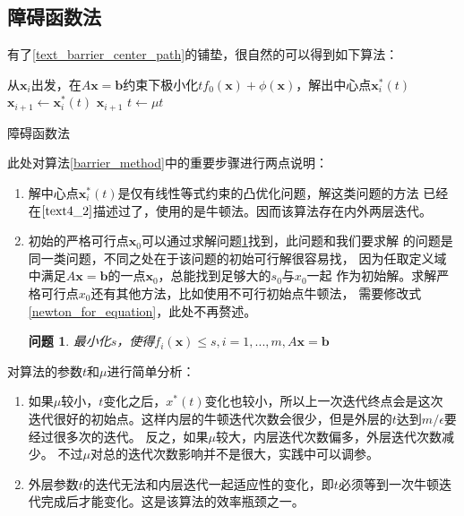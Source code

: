 \documentclass{article}
\newtheorem{problem}{问题}
\begin{document}
\subsection{障碍函数法}
\label{text_barrier_method}
有了\ref{text_barrier_center_path}的铺垫，很自然的可以得到如下算法：

\renewcommand{\algorithmcfname}{算法}
\begin{algorithm}[H]
     {
        从$\bm x_i$出发，在$A\bm x=\bm b$约束下极小化$tf_0(\bm x)+\phi(\bm x)$，解出中心点$\bm x_i^*(t)$\;
        $\bm x_{i+1}\leftarrow\bm x_i^*(t)$\;
         {
            \Return $\bm x_{i+1}$
        }
        $t\leftarrow \mu t$
    }
    \caption{障碍函数法}
    \label{barrier_method}
\end{algorithm}

此处对算法\ref{barrier_method}中的重要步骤进行两点说明：
\begin{enumerate}
    \item 解中心点$\bm x_i^*(t)$是仅有线性等式约束的凸优化问题，解这类问题的方法
    已经在$\ref{text4_2}$描述过了，使用的是牛顿法。因而该算法存在内外两层迭代。
    \item 初始的严格可行点$\bm x_0$可以通过求解问题\ref{prepare}找到，此问题和我们要求解
    的问题是同一类问题，不同之处在于该问题的初始可行解很容易找，
    因为任取定义域中满足$A\bm x=\bm b$的一点$\bm x_0$，总能找到足够大的$s_0$与$x_0$一起
    作为初始解。求解严格可行点$x_0$还有其他方法，比如使用不可行初始点牛顿法，
    需要修改式\ref{newton_for_equation}，此处不再赘述。
    \begin{problem}
        最小化$s$，使得$f_i(\bm x)\le s,i=1,...,m,A\bm x=\bm b$
        \label{prepare}
    \end{problem}
\end{enumerate} 
对算法的参数$t$和$\mu$进行简单分析：
\begin{enumerate}
    \item 如果$\mu$较小，$t$变化之后，$x^*(t)$变化也较小，所以上一次迭代终点会是这次
    迭代很好的初始点。这样内层的牛顿迭代次数会很少，但是外层的$t$达到$m/\epsilon$要经过很多次的迭代。
    反之，如果$\mu$较大，内层迭代次数偏多，外层迭代次数减少。
    不过$\mu$对总的迭代次数影响并不是很大，实践中可以调参。
    \item 外层参数$t$的迭代无法和内层迭代一起适应性的变化，即$t$必须等到一次牛顿迭代完成后才能变化。这是该算法的效率瓶颈之一。
\end{enumerate}
\end{document}

